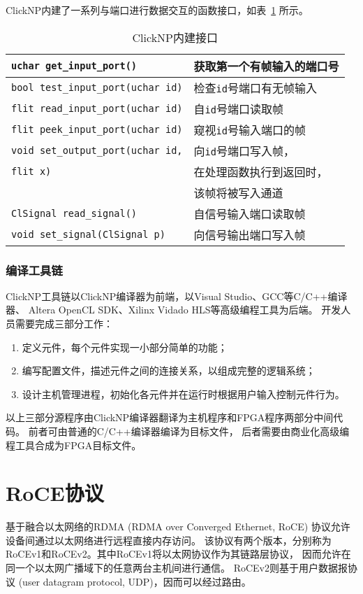 ClickNP内建了一系列与端口进行数据交互的函数接口，如表~\ref{tab:operations} 所示。
\begin{table}[htbp]
\centering
\caption{ClickNP内建接口}\label{tab:operations}
\begin{tabular}{l|l}
\toprule
\lstinline$uchar get_input_port()$         & 获取第一个有帧输入的端口号 \\
\midrule
\lstinline$bool test_input_port(uchar id)$ & 检查\lstinline$id$号端口有无帧输入 \\
\midrule
\lstinline$flit read_input_port(uchar id)$ & 自\lstinline$id$号端口读取帧 \\
\midrule
\lstinline$flit peek_input_port(uchar id)$ & 窥视\lstinline$id$号输入端口的帧 \\
\midrule
\lstinline$void set_output_port(uchar id,$ & 向\lstinline$id$号端口写入帧， \\
\lstinline$flit x)$                        & 在处理函数执行到返回时， \\
                                           & 该帧将被写入通道 \\
\midrule
\lstinline$ClSignal read_signal()$         & 自信号输入端口读取帧 \\
\midrule
\lstinline$void set_signal(ClSignal p)$    & 向信号输出端口写入帧 \\
\bottomrule
\end{tabular}
\end{table}

\subsubsection{编译工具链}
ClickNP工具链以ClickNP编译器为前端，以Visual Studio、GCC等C/C++编译器、
Altera OpenCL SDK、Xilinx Vidado HLS等高级编程工具为后端。
开发人员需要完成三部分工作：
\begin{enumerate}
\item 定义元件，每个元件实现一小部分简单的功能；
\item 编写配置文件，描述元件之间的连接关系，以组成完整的逻辑系统；
\item 设计主机管理进程，初始化各元件并在运行时根据用户输入控制元件行为。
\end{enumerate}

以上三部分源程序由ClickNP编译器翻译为主机程序和FPGA程序两部分中间代码。
前者可由普通的C/C++编译器编译为目标文件，
后者需要由商业化高级编程工具合成为FPGA目标文件。



\section{RoCE协议}
基于融合以太网络的RDMA (RDMA over Converged Ethernet, RoCE) 协议允许设备间通过以太网络进行远程直接内存访问。
该协议有两个版本，分别称为RoCEv1和RoCEv2。其中RoCEv1将以太网协议作为其链路层协议，
因而允许在同一个以太网广播域下的任意两台主机间进行通信\cite{a16}。
RoCEv2则基于用户数据报协议 (user datagram protocol, UDP)，因而可以经过路由\cite{a17, considerations, storage}。

